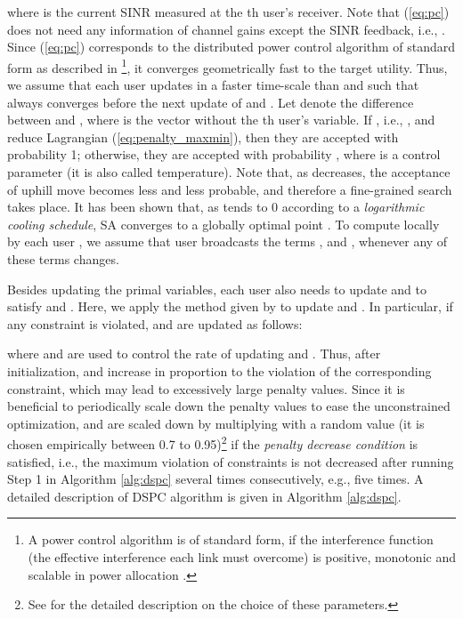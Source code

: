 \documentclass[10pt,journal,letterpaper,compsoc]{IEEEtran}
\begin{document}
{{where  is the current SINR measured at the th user's receiver. Note that (\ref{eq:pc}) does not need any information of channel gains except the SINR feedback, i.e., . Since (\ref{eq:pc}) corresponds to the distributed power control algorithm of standard form as described in \cite{yates:1995}\footnote{A power control algorithm is of standard form, if the interference function (the effective interference each link must overcome) is positive, monotonic and scalable in power allocation \cite{yates:1995}.}, it converges geometrically fast to the target utility. Thus, we assume that each user  updates  in a faster time-scale than  and  such that  always converges before the next update of  and .
Let  denote the difference between  and , where  is the vector  without the th user's variable. If , i.e., ,  and  reduce Lagrangian (\ref{eq:penalty_maxmin}), then they are accepted with probability 1; otherwise, they are accepted with probability , where  is a control parameter (it is also called temperature). Note that, as  decreases, the acceptance of uphill move becomes less and less probable, and therefore a fine-grained search takes place. It has been shown that, as  tends to 0 according to a \emph{logarithmic cooling schedule}, SA converges to a globally optimal point \cite{geman:1984,hajek:1988}. To compute  locally by each user , we assume that user  broadcasts the terms ,  and , whenever any of these terms changes.


Besides updating the primal variables, each user  also needs to update  and  to satisfy  and . Here, we apply the method given by \cite{chen:2008} to update  and . In particular, if any constraint is violated,  and  are updated as follows:

where  and  are used to control the rate of updating  and . Thus, after initialization,  and  increase in proportion to the violation of the corresponding constraint, which may lead to excessively large penalty values. Since it is beneficial to periodically scale down the penalty values to ease the unconstrained optimization,  and  are scaled down by multiplying with a random value (it is chosen empirically between 0.7 to 0.95){\footnote{See \cite{chen:2008} for the detailed description on the choice of these parameters.\label{fn:scaledown}}} if the \emph{penalty decrease condition} is satisfied, i.e., the maximum violation of constraints is not decreased after running Step 1 in Algorithm \ref{alg:dspc} several times consecutively, e.g., five times. A detailed description of DSPC algorithm is given in Algorithm \ref{alg:dspc}.

}}
\end{document}
